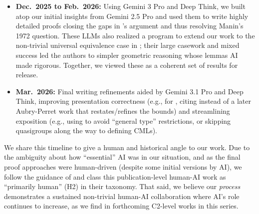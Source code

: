 \documentclass[11pt]{article}
\theoremstyle{definition}
\begin{document}
\begin{ai}
\begin{itemize}
  \item \textbf{Dec.\ 2025 to Feb.\ 2026:} Using Gemini 3 Pro and Deep Think, we built atop our initial insights from Gemini 2.5 Pro and used them to write highly detailed proofs closing the gaps in \cite{dkbrauer}'s argument and thus resolving Manin's 1972 question. These LLMs also realized a program to extend our work to the non-trivial universal equivalence case in \cite[\S 3.4]{dimitrikanevsky}; their large casework and mixed success led the authors to simpler geometric reasoning whose lemmas AI  made rigorous. Together, we viewed these as a coherent set of results for release.
  \item \textbf{Mar.\ 2026:} Final writing refinements aided by Gemini 3.1 Pro and Deep Think, improving presentation correctness (e.g., for , citing \cite{aubry1996weil} \cite{leep1994number} instead of a later Aubry-Perret work that restates/refines the bounds) and streamlining exposition (e.g., using \cite{kollar2003rational} to avoid ``general type'' restrictions, or skipping quasigroups along the way to defining CMLs).
\end{itemize}

We share this timeline to give a human and historical angle to our work. Due to the ambiguity about how ``essential'' AI was in our situation, and as the final proof approaches were human-driven (despite some initial versions by AI), we follow the guidance of \cite[5.1.1]{feng2026aletheia} and class this publication-level human-AI work as ``primarily human'' (H2) in their taxonomy. That said, we believe our \textit{process} demonstrates a sustained non-trivial human-AI collaboration where AI's role continues to increase, as we find in forthcoming C2-level works in this series.
\end{ai}



\end{document}

